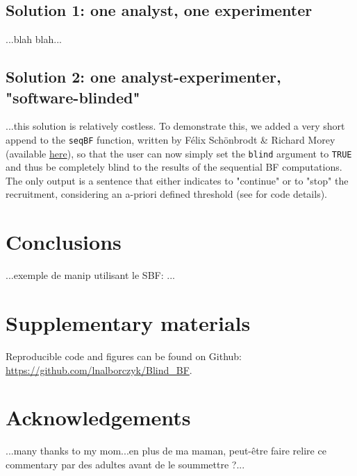 \documentclass[a4paper,man,natbib,floatsintext,donotrepeattitle]{apa6}
\begin{document}
\subsection{Solution 1: one analyst, one experimenter}

...blah blah...

\subsection{Solution 2: one analyst-experimenter, "software-blinded"}

...this solution is relatively costless. To demonstrate this, we added a very short append to the \texttt{seqBF} function, written by Félix Schönbrodt \& Richard Morey (available \href{https://raw.githubusercontent.com/richarddmorey/BayesFactorExtras/master/BayesFactorExtras/R/seqBF.R}{here}), so that the user can now simply set the \texttt{blind} argument to \texttt{TRUE} and thus be completely blind to the results of the sequential BF computations. The only output is a sentence that either indicates to "continue" or to "stop" the recruitment, considering an a-priori defined threshold (see  for code details).

\section{Conclusions}

...exemple de manip utilisant le SBF: \cite{martin_perceiving_2016}...

\section{Supplementary materials}\label{sec:supp}

Reproducible code and figures can be found on Github: \url{https://github.com/lnalborczyk/Blind_BF}.


\section{Acknowledgements}

...many thanks to my mom...en plus de ma maman, peut-être faire relire ce commentary par des adultes avant de le soummettre ?...


\end{document}
